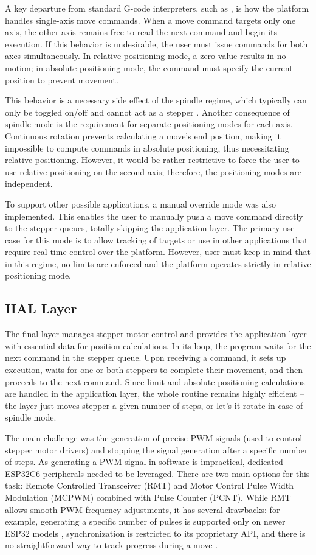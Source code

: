 A key departure from standard G-code interpreters, such as \cite{duet}, is how the platform handles single-axis move commands.
When a move command targets only one axis, the other axis remains free to read the next command and begin its execution.
If this behavior is undesirable, the user must issue commands for both axes simultaneously.
In relative positioning mode, a zero value results in no motion; in absolute positioning mode, the command must specify the current position to prevent movement.

This behavior is a necessary side effect of the spindle regime, which typically can only be toggled on/off and cannot act as a stepper \cite{duet}.
Another consequence of spindle mode is the requirement for separate positioning modes for each axis.
Continuous rotation prevents calculating a move’s end position, making it impossible to compute commands in absolute positioning, thus necessitating relative positioning.
However, it would be rather restrictive to force the user to use relative positioning on the second axis; therefore, the positioning modes are independent.

To support other possible applications, a manual override mode was also implemented.
This enables the user to manually push a move command directly to the stepper queues, totally skipping the application layer.
The primary use case for this mode is to allow tracking of targets or use in other applications that require real-time control over the platform.
However, user must keep in mind that in this regime, no limits are enforced and the platform operates strictly in relative positioning mode.

\subsection{HAL Layer}

The final layer manages stepper motor control and provides the application layer with essential data for position calculations.
In its loop, the program waits for the next command in the stepper queue.
Upon receiving a command, it sets up execution, waits for one or both steppers to complete their movement, and then proceeds to the next command.
Since limit and absolute positioning calculations are handled in the application layer, the whole routine remains highly efficient -- the layer just moves stepper a given number of steps, or let's it rotate in case of spindle mode.

The main challenge was the generation of precise PWM signals (used to control stepper motor drivers) and stopping the signal generation after a specific number of steps.
As generating a PWM signal in software is impractical, dedicated ESP32C6 peripherals needed to be leveraged.
There are two main options for this task: Remote Controlled Transceiver (RMT) and Motor Control Pulse Width Modulation (MCPWM) combined with Pulse Counter (PCNT).
While RMT allows smooth PWM frequency adjustments, it has several drawbacks: for example, generating a specific number of pulses is supported only on newer ESP32 models \cite{gitRMT}, synchronization is restricted to its proprietary API, and there is no straightforward way to track progress during a move \cite{espRMT}.

